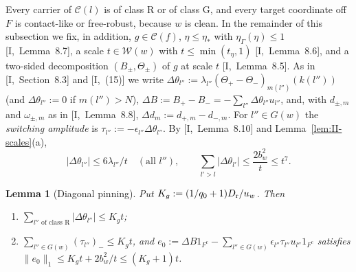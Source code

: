 \documentclass[10pt]{amsart}
\newtheorem{lemma}[theorem]{Lemma}
\theoremstyle{definition}
\theoremstyle{remark}
\newcommand{\Cset}{\mathcal C}
\begin{document}
Every carrier of $\mathcal C(l)$ is of class R or of class G, and every
target coordinate off $F$ is contact-like or free-robust, because $w$ is
clean.  In the remainder of this subsection we fix, in addition, $g\in
\Cset(f)$, $\eta\le\eta_*$ with $\eta_\Gamma(\eta)\le1$
[I,~Lemma~8.7], a scale $t\in\mathcal W(w)$ with $t\le\min(t_\eta,1)$
[I,~Lemma~8.6], and a two-sided decomposition $(B_\pm,\Theta_\pm)$ of $g$
at scale $t$ [I,~Lemma~8.5].  As in [I,~Section~8.3] and
[I,~(15)] we write $\Delta\theta_{l''}:=\lambda_{l''}(\Theta_{+}-
\Theta_-)_{m(l'')}(k(l''))$ (and $\Delta\theta_{l''}:=0$ if $m(l'')>N$),
$\Delta B:=B_+-B_-=-\sum_{l''}\Delta\theta_{l''}u_{l''}$, and, with
$d_{\pm,m}$ and $\omega_{\pm,m}$ as in [I,~Lemma~8.8],
$\Delta d_m:=d_{+,m}-d_{-,m}$.  For $l''\in G(w)$ the \emph{switching
amplitude} is $\tau_{l''}:=-\epsilon_{l''}\Delta\theta_{l''}$.  By
[I,~Lemma~8.10] and Lemma~\ref{lem:II-scales}(a),
\begin{equation}\label{eq:II-fine}
 |\Delta\theta_{l''}|\le6\lambda_{l''}/t\quad(\text{all }l''),\qquad
 \sum_{l'>l}|\Delta\theta_{l'}|\le\frac{2b_w^2}t\le t^7 .
\end{equation}

\begin{lemma}[Diagonal pinning]\label{lem:II-diagpin}
Put $K_g:=(1/q_0+1)D_{\rm r}/u_w$.  Then
\begin{enumerate}
\item[(a)] $\sum_{l''\text{ of class R}}|\Delta\theta_{l''}|\le K_gt$;
\item[(b)] $\sum_{l''\in G(w)}(\tau_{l''})_-\le K_gt$, and
$e_0:=\Delta B1_{F^c}-\sum_{l''\in G(w)}\epsilon_{l''}\tau_{l''}u_{l''}
1_{F^c}$ satisfies $\|e_0\|_1\le K_gt+2b_w^2/t\le(K_g+1)t$.
\end{enumerate}
\end{lemma}
\end{document}

